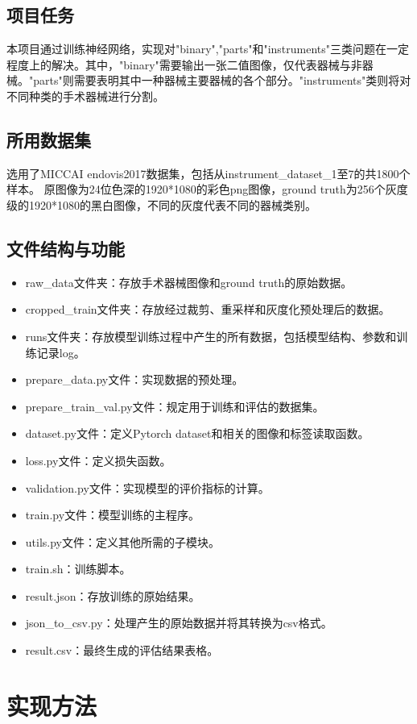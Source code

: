 \documentclass[UTF8]{ctexart}
\begin{document}
\subsection{项目任务}
本项目通过训练神经网络，实现对"binary","parts"和"instruments"三类问题在一定程度上的解决。其中，"binary"需要输出一张二值图像，仅代表器械与非器械。"parts"则需要表明其中一种器械主要器械的各个部分。"instruments"类则将对不同种类的手术器械进行分割。

\subsection{所用数据集}
选用了MICCAI endovis2017数据集，包括从instrument\_dataset\_1至7的共1800个样本。
原图像为24位色深的1920*1080的彩色png图像，ground truth为256个灰度级的1920*1080的黑白图像，不同的灰度代表不同的器械类别。

\subsection{文件结构与功能}
\begin{itemize}
    \item raw\_data文件夹：存放手术器械图像和ground truth的原始数据。
    \item cropped\_train文件夹：存放经过裁剪、重采样和灰度化预处理后的数据。
    \item runs文件夹：存放模型训练过程中产生的所有数据，包括模型结构、参数和训练记录log。
    \item prepare\_data.py文件：实现数据的预处理。
    \item prepare\_train\_val.py文件：规定用于训练和评估的数据集。
    \item dataset.py文件：定义Pytorch dataset和相关的图像和标签读取函数。
    \item loss.py文件：定义损失函数。
    \item validation.py文件：实现模型的评价指标的计算。
    \item train.py文件：模型训练的主程序。
    \item utils.py文件：定义其他所需的子模块。
    \item train.sh：训练脚本。
    \item result.json：存放训练的原始结果。
    \item json\_to\_csv.py：处理产生的原始数据并将其转换为csv格式。
    \item result.csv：最终生成的评估结果表格。
\end{itemize}


\section{实现方法}
\end{document}
